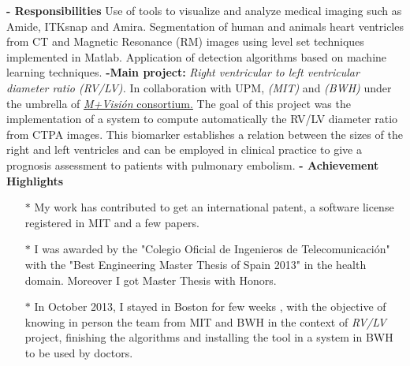 \documentclass[10pt,a4paper]{moderncv}
\begin{document}
\hfill \begin{minipage}{0.85\textwidth}\small 
\textbf{- Responsibilities} \newline Use of tools to visualize and analyze medical imaging such as Amide, ITKsnap and Amira. Segmentation of human and animals heart ventricles from CT and Magnetic Resonance (RM) images using level set techniques implemented in Matlab.  Application of detection algorithms based on machine learning techniques. \vspace{0.2cm}\newline \textbf{-Main project:} \textit{Right ventricular to left ventricular diameter ratio (RV/LV).} \newline In collaboration with UPM, \textit{(MIT)} and \textit{(BWH)} under the umbrella of \href{http://mvisionconsortium.mit.edu/}{\textit{M+Visión} consortium.} The goal of this project was the implementation of a system to compute automatically the RV/LV diameter ratio from CTPA images. This biomarker establishes a relation between the sizes of the right and left ventricles and can be employed in clinical practice to give a prognosis assessment to patients with pulmonary embolism. \vspace{0.2cm} \newline \textbf{- Achievement Highlights} \newline \begin{itemize} \item[$*$] My work has contributed to get an international patent, a software license registered in MIT and a few papers. \item[$*$] I was awarded by the "Colegio Oficial de Ingenieros de Telecomunicación" with the "Best Engineering Master Thesis of Spain 2013" in the health domain. Moreover I got Master Thesis with Honors. \item[$*$] In October 2013, I stayed in Boston for few weeks , with the objective of knowing in person the team from MIT and BWH in the context of \textit{RV/LV} project, finishing the algorithms and installing the tool in a system in BWH to be used by doctors. \end{itemize}
\end{minipage}


\end{document}

